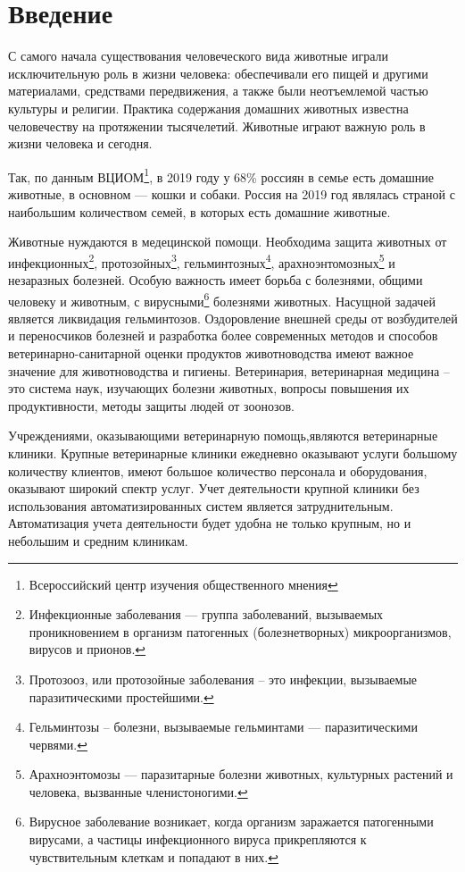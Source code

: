 \documentclass[a4paper,14pt]{article}
\begin{document}
\setcounter{page}{2}
\tableofcontents

\newpage
\section*{Введение}

С самого начала существования человеческого вида животные играли исключительную роль в жизни человека: обеспечивали его пищей и другими материалами, средствами передвижения, а также были неотъемлемой частью культуры и религии. Практика содержания домашних животных известна человечеству на протяжении тысячелетий. Животные играют важную роль в жизни человека и сегодня.

Так, по данным ВЦИОМ\footnote{Всероссийский центр изучения общественного мнения}, в 2019 году у 68\% россиян в семье есть домашние животные, в основном — кошки и собаки. Россия на 2019 год являлась страной с наибольшим количеством семей, в которых есть домашние животные.

Животные нуждаются в медецинской помощи. 
Необходима защита животных от инфекционных\footnote{Инфекционные заболевания — группа заболеваний, вызываемых проникновением в организм патогенных (болезнетворных) микроорганизмов, вирусов и прионов.}, протозойных\footnote{Протозооз, или протозойные заболевания – это  инфекции, вызываемые паразитическими простейшими.}, гельминтозных\footnote{Гельминтозы -- болезни, вызываемые гельминтами — паразитическими червями.
}, арахноэнтомозных\footnote{Арахноэнтомозы — паразитарные болезни животных, культурных растений и человека, вызванные членистоногими. } и незаразных болезней.
Особую важность имеет борьба с болезнями, общими человеку и животным, с вирусными\footnote{Вирусное заболевание возникает, когда организм заражается патогенными вирусами, а частицы инфекционного вируса прикрепляются к чувствительным клеткам и попадают в них.} болезнями животных.
Насущной задачей является ликвидация гельминтозов.
Оздоровление внешней среды от возбудителей и переносчиков болезней и разработка более современных методов и способов ветеринарно-санитарной оценки продуктов животноводства имеют важное значение для животноводства и гигиены.
Ветеринария, ветеринарная медицина -- это система наук, изучающих болезни животных, вопросы повышения их продуктивности, методы защиты людей от зоонозов.

Учреждениями, оказывающими ветеринарную помощь,являются ветеринарные клиники. Крупные ветеринарные клиники ежедневно оказывают услуги большому количеству клиентов, имеют большое количество персонала и оборудования, оказывают широкий спектр услуг. Учет деятельности крупной клиники без использования автоматизированных систем является затруднительным. Автоматизация учета деятельности будет удобна не только крупным, но и небольшим и средним клиникам.
\end{document}
